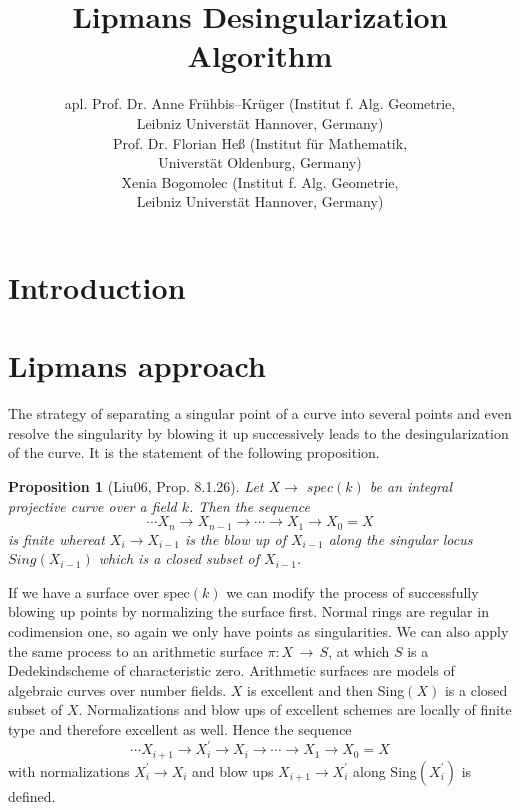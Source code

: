 \documentclass{article}
\title{Lipmans Desingularization Algorithm}
\author{
	apl. Prof. Dr. Anne Fr\"uhbis--Kr\"uger (Institut f. Alg. Geometrie, \\
        Leibniz Universt\"at Hannover, Germany)\\
 	Prof. Dr. Florian Heß (Institut für Mathematik, \\
        Universt\"at Oldenburg, Germany)\\
	Xenia Bogomolec (Institut f. Alg. Geometrie, \\
        Leibniz Universt\"at Hannover, Germany)
}
\newtheorem{prop}[thm]{Proposition}
\begin{document}
\maketitle

\abstract{}

\section{Introduction}

\section{Lipmans approach} 
\label{sec2}

The strategy of separating a singular point of a curve into several points and 
even resolve the singularity by blowing it up successively leads to the 
desingularization of the curve. It is the statement of the following proposition.\\


\begin{prop}[Liu06, Prop. 8.1.26]
Let $X \rightarrow$ $spec(k)$ be an integral projective curve over a field $k$.
Then the sequence
$$ \cdots X_{n}\rightarrow X_{n-1}\rightarrow\cdots\rightarrow X_1\rightarrow X_0=X$$
is finite whereat $X_{i}\rightarrow X_{i-1}$ is the blow up of $X_{i-1}$ along the 
singular locus $Sing(X_{i-1})$ which is a closed subset of $X_{i-1}$.
\end{prop}

\noindent
If we have a surface over spec$(k)$ we can modify the process of successfully 
blowing up points by normalizing the surface first. Normal rings are regular 
in codimension one, so again we only have points as singularities. 
We can also apply the same process to an arithmetic surface $\pi:X\,\rightarrow\,S$, 
at which $S$ is a Dedekindscheme of characteristic zero.
Arithmetic surfaces are models of algebraic curves over number fields. 
$X$ is excellent and then Sing$(X)$ is a closed subset of $X$. 
Normalizations and blow ups of excellent schemes 
are locally of finite type and therefore excellent as well. Hence the sequence
$$ \cdots X_{i+1}\rightarrow X_i^\prime\rightarrow X_i\rightarrow\cdots\rightarrow X_1\rightarrow X_0=X$$
with normalizations $X_i^\prime\rightarrow X_i$ and blow ups $X_{i+1}\rightarrow X_i^\prime$ 
along Sing$(X_i^\prime)$ is defined.
\end{document}
